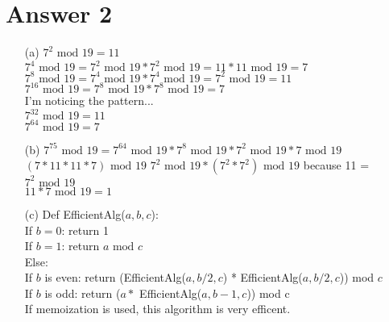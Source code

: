 \documentclass[11pt]{article}
\theoremstyle{definition}
\begin{document}
\section*{Answer 2}
\begin{enumerate}
	\item[(a)]
	$7^2 \text{ mod } 19 = 11$\\
	$7^4 \text{ mod } 19 = 7^2 \text{ mod } 19 * 7^2 \text{ mod } 19 = 11 * 11 \text{ mod } 19 = 7$\\
	$7^8 \text{ mod } 19 = 7^4 \text{ mod } 19 * 7^4 \text{ mod } 19 = 7^2 \text{ mod } 19 = 11$\\
	$7^{16} \text{ mod } 19 = 7^8 \text{ mod } 19 * 7^8 \text{ mod } 19 = 7$\\
	I'm noticing the pattern...\\
	$7^{32} \text{ mod } 19 = 11$\\
	$7^{64} \text{ mod } 19 = 7$

	\item[(b)]
	$7^{75} \text{ mod } 19 = 7^{64} \text{ mod } 19 * 7^8 \text{ mod } 19 * 7^2 \text{ mod } 19 * 7 \text{ mod } 19$\\
	$(7 * 11 * 11 * 7) \text{ mod } 19$
	$7^2 \text{ mod } 19 * (7^2 * 7^2) \text{ mod } 19$ because 11 = $7^2 \text{ mod } 19$\\
	$11 * 7 \text{ mod } 19 = 1$\\

	\item[(c)]
	Def EfficientAlg($a, b, c$):\\
	If $b = 0$: return 1\\
	If $b = 1$: return $a \text{ mod } c$\\
	Else:\\
	If $b$ is even: return (EfficientAlg($a, b/2, c$) * EfficientAlg($a, b/2, c$)) mod $c$\\
	If $b$ is odd: return ($a * $ EfficientAlg($a, b-1, c$)) mod c\\
	If memoization is used, this algorithm is very efficent.

\end{enumerate}
\end{document}
